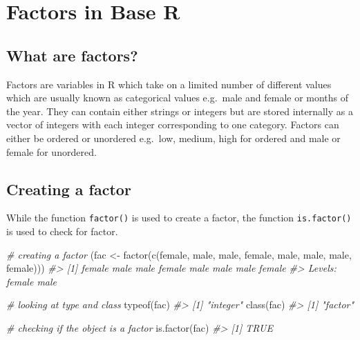 \documentclass[
]{book}
\newenvironment{Shaded}{\begin{snugshade}}{\end{snugshade}}
\newcommand{\CommentTok}[1]{\textcolor[rgb]{0.56,0.35,0.01}{\textit{#1}}}
\newcommand{\FunctionTok}[1]{\textcolor[rgb]{0.00,0.00,0.00}{#1}}
\newcommand{\NormalTok}[1]{#1}
\newcommand{\OtherTok}[1]{\textcolor[rgb]{0.56,0.35,0.01}{#1}}
\newcommand{\StringTok}[1]{\textcolor[rgb]{0.31,0.60,0.02}{#1}}
\begin{document}
\hypertarget{br-factor}{%
\section{Factors in Base R}\label{br-factor}}

\hypertarget{what-are-factors}{%
\subsection{What are factors?}\label{what-are-factors}}

Factors are variables in R which take on a limited number of different values which are usually known as categorical values e.g.~male and female or months of the year. They can contain either strings or integers but are stored internally as a vector of integers with each integer corresponding to one category.
Factors can either be ordered or unordered e.g.~low, medium, high for ordered and male or female for unordered.

\hypertarget{creating-a-factor}{%
\subsection{Creating a factor}\label{creating-a-factor}}

While the function \texttt{factor()} is used to create a factor, the function \texttt{is.factor()} is used to check for factor.

\begin{Shaded}
\begin{Highlighting}[]
\CommentTok{\# creating a factor}
\NormalTok{(fac }\OtherTok{\textless{}{-}} \FunctionTok{factor}\NormalTok{(}\FunctionTok{c}\NormalTok{(}\StringTok{\textquotesingle{}female\textquotesingle{}}\NormalTok{, }\StringTok{\textquotesingle{}male\textquotesingle{}}\NormalTok{, }\StringTok{\textquotesingle{}male\textquotesingle{}}\NormalTok{, }\StringTok{\textquotesingle{}female\textquotesingle{}}\NormalTok{, }\StringTok{\textquotesingle{}male\textquotesingle{}}\NormalTok{, }\StringTok{\textquotesingle{}male\textquotesingle{}}\NormalTok{, }\StringTok{\textquotesingle{}male\textquotesingle{}}\NormalTok{, }\StringTok{\textquotesingle{}female\textquotesingle{}}\NormalTok{)))}
\CommentTok{\#\textgreater{} [1] female male   male   female male   male   male   female}
\CommentTok{\#\textgreater{} Levels: female male}

\CommentTok{\# looking at type and class}
\FunctionTok{typeof}\NormalTok{(fac)}
\CommentTok{\#\textgreater{} [1] "integer"}
\FunctionTok{class}\NormalTok{(fac)}
\CommentTok{\#\textgreater{} [1] "factor"}

\CommentTok{\# checking if the object is a factor}
\FunctionTok{is.factor}\NormalTok{(fac)}
\CommentTok{\#\textgreater{} [1] TRUE}
\end{Highlighting}
\end{Shaded}
\end{document}
